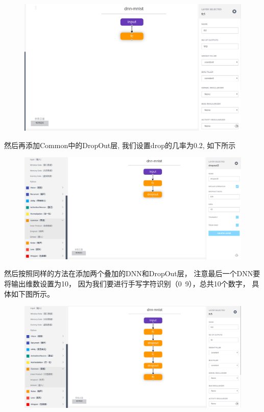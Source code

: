 \documentclass{progbookcn}
\begin{document}
\begin{figure}[H]
  \centering
  \includegraphics[width=0.98\linewidth]{example_fc.png}
\end{figure}


然后再添加Common中的DropOut层, 我们设置drop的几率为0.2, 如下所示

\begin{figure}[H]
  \centering
  \includegraphics[width=0.98\linewidth]{example_dropout.png}
\end{figure}

然后按照同样的方法在添加两个叠加的DNN和DropOut层， 注意最后一个DNN要将输出维数设置为10， 因为我们要进行手写字符识别（0~9），总共10个数字， 具体如下图所示。

\begin{figure}[H]
  \centering
  \includegraphics[width=0.98\linewidth]{example_three_dnn.png}
\end{figure}
\end{document}
